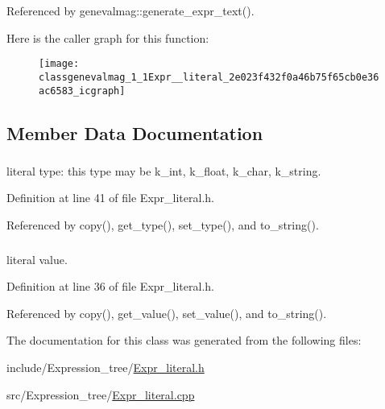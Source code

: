 Referenced by genevalmag::generate\_\-expr\_\-text().

Here is the caller graph for this function:\nopagebreak
\begin{figure}[H]
\begin{center}
\leavevmode
\texttt{[image: classgenevalmag\_1\_1Expr\_\_literal\_2e023f432f0a46b75f65cb0e36ac6583\_icgraph]}
\end{center}
\end{figure}


\subsection{Member Data Documentation}
\hypertarget{classgenevalmag_1_1Expr__literal_9f3d9f0bda8307403f79d3260fa27740}{
\subsubsection[{type}]{}}
\label{classgenevalmag_1_1Expr__literal_9f3d9f0bda8307403f79d3260fa27740}


literal type: this type may be k\_\-int, k\_\-float, k\_\-char, k\_\-string. 



Definition at line 41 of file Expr\_\-literal.h.

Referenced by copy(), get\_\-type(), set\_\-type(), and to\_\-string().\hypertarget{classgenevalmag_1_1Expr__literal_914b947ed414c6aae35eb7abcf8c7128}{
\subsubsection[{value}]{}}
\label{classgenevalmag_1_1Expr__literal_914b947ed414c6aae35eb7abcf8c7128}


literal value. 



Definition at line 36 of file Expr\_\-literal.h.

Referenced by copy(), get\_\-value(), set\_\-value(), and to\_\-string().

The documentation for this class was generated from the following files:\begin{CompactItemize}
\item 
include/Expression\_\-tree/\hyperlink{Expr__literal_8h}{Expr\_\-literal.h}\item 
src/Expression\_\-tree/\hyperlink{Expr__literal_8cpp}{Expr\_\-literal.cpp}\end{CompactItemize}
